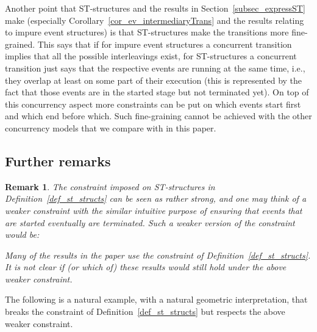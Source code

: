 \documentclass[submission,copyright,creativecommons]{eptcs}
\newtheorem{remark}[theorem]{Remark}
\begin{document}
Another point that ST-structures and the results in Section~\ref{subsec_expressST} make (especially Corollary~\ref{cor_ev_intermediaryTrans} and the results relating to impure event structures) is that ST-structures make the transitions more fine-grained. This says that if for impure event structures a concurrent transition implies that all the possible interleavings exist, for ST-structures a concurrent transition just says that the respective events are running at the same time, i.e., they overlap at least on some part of their execution (this is represented by the fact that those events are in the started stage but not terminated yet). On top of this concurrency aspect more constraints can be put on which events start first and which end before which. Such fine-graining cannot be achieved with the other concurrency models that we compare with in this paper.


\subsection{Further remarks}



\begin{remark}\label{remark_weak_ST_constraint}
The constraint imposed on ST-structures in Definition~\ref{def_st_structs} can be seen as rather strong, and one may think of a weaker constraint with the similar intuitive purpose of ensuring that events that are started eventually are terminated. Such a weaker version of the constraint would be:

Many of the results in the paper use the constraint of Definition~\ref{def_st_structs}. It is not clear if (or which of) these results would still hold under the above weaker constraint.
\end{remark}


The following is a natural example, with a natural geometric interpretation, that breaks the constraint of Definition~\ref{def_st_structs} but respects the above weaker constraint.
\end{document}

